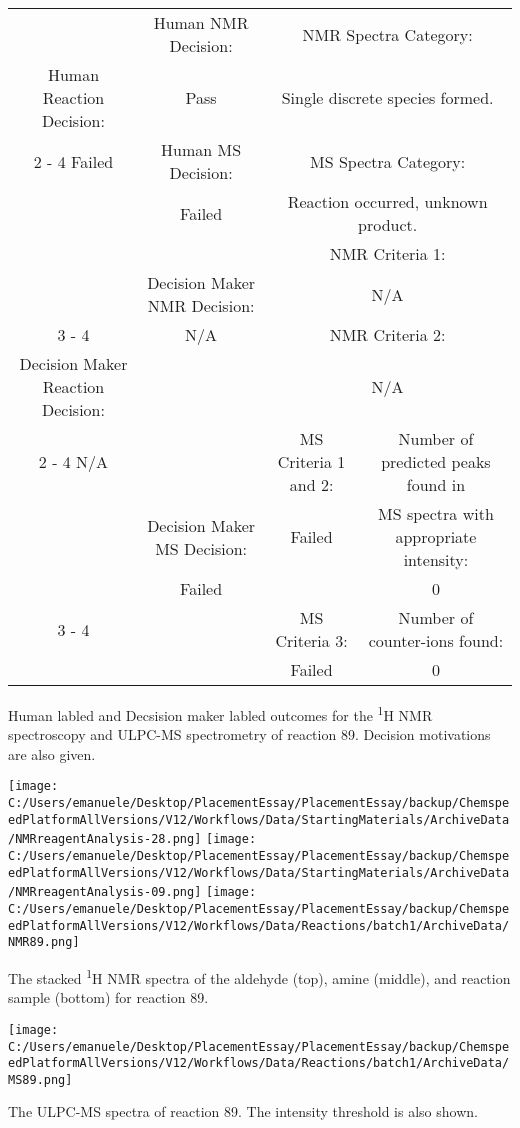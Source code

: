 \documentclass{article}%
\begin{document}
\begin{Decision Table}[H]%
\begin{tabular}{|c|c|c|c|}%
\hline%
&Human NMR Decision:&\multicolumn{2}{|c|}{NMR Spectra Category:}\\%
Human Reaction Decision:&Pass&\multicolumn{2}{|c|}{Single discrete species formed.}\\%
\cline{2%
-%
4}%
Failed&Human MS Decision:&\multicolumn{2}{|c|}{MS Spectra Category:}\\%
&Failed&\multicolumn{2}{|c|}{Reaction occurred, unknown product.}\\%
\hline%
&&\multicolumn{2}{|c|}{NMR Criteria 1:}\\%
&Decision Maker NMR Decision:&\multicolumn{2}{|c|}{N/A}\\%
\cline{3%
-%
4}%
&N/A&\multicolumn{2}{|c|}{NMR Criteria 2:}\\%
Decision Maker Reaction Decision:&&\multicolumn{2}{|c|}{N/A}\\%
\cline{2%
-%
4}%
N/A&&MS Criteria 1 and 2:&Number of predicted peaks found in\\%
&Decision Maker MS Decision:&Failed&MS spectra with appropriate intensity:\\%
&Failed&&0\\%
\cline{3%
-%
4}%
&&MS Criteria 3:&Number of counter{-}ions found:\\%
&&Failed&0\\%
\hline%
\end{tabular}%
\caption{Human labled and Decsision maker labled outcomes for the \textsuperscript{1}H NMR spectroscopy and ULPC-MS spectrometry of reaction 89. Decision motivations are also given.}%
\end{Decision Table}%
\begin{NMR Spectra}[H]%
\begin{center}%
\texttt{[image: C:/Users/emanuele/Desktop/PlacementEssay/PlacementEssay/backup/ChemspeedPlatformAllVersions/V12/Workflows/Data/StartingMaterials/ArchiveData/NMRreagentAnalysis-28.png]}\hfill%
\texttt{[image: C:/Users/emanuele/Desktop/PlacementEssay/PlacementEssay/backup/ChemspeedPlatformAllVersions/V12/Workflows/Data/StartingMaterials/ArchiveData/NMRreagentAnalysis-09.png]}\hfill%
\texttt{[image: C:/Users/emanuele/Desktop/PlacementEssay/PlacementEssay/backup/ChemspeedPlatformAllVersions/V12/Workflows/Data/Reactions/batch1/ArchiveData/NMR89.png]}\hfill%
\end{center}%
\caption{The stacked \textsuperscript{1}H NMR spectra of the aldehyde (top), amine (middle), and reaction sample (bottom) for reaction 89.}%
\end{NMR Spectra}%
\begin{MS Spectra}[H]%
\begin{center}%
\texttt{[image: C:/Users/emanuele/Desktop/PlacementEssay/PlacementEssay/backup/ChemspeedPlatformAllVersions/V12/Workflows/Data/Reactions/batch1/ArchiveData/MS89.png]}\hfill%
\end{center}%
\caption{The ULPC-MS spectra of reaction 89. The intensity threshold is also shown.}%
\end{MS Spectra}%
\end{document}
